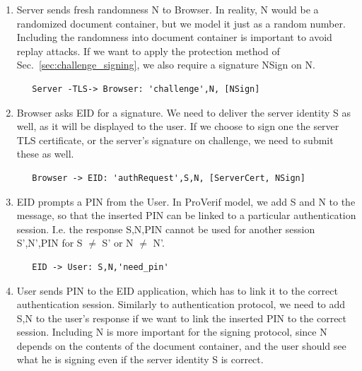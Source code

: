 \begin{enumerate}
\item Server sends fresh randomness N to Browser. In reality, N would be a randomized document container, but we model it just as a random number. Including the randomness into document container is important to avoid replay attacks. If we want to apply the protection method of Sec.~\ref{sec:challenge_signing}, we also require a signature NSign on N.
\begin{verbatim}
   Server -TLS-> Browser: 'challenge',N, [NSign]
\end{verbatim}
\item Browser asks EID for a signature. We need to deliver the server identity S as well, as it will be displayed to the user. If we choose to sign one the server TLS certificate, or the server's signature on challenge, we need to submit these as well.
\begin{verbatim}
   Browser -> EID: 'authRequest',S,N, [ServerCert, NSign]
\end{verbatim}
\item EID prompts a PIN from the User. In ProVerif model, we add S and N to the message, so that the inserted PIN can be linked to a particular authentication session. I.e. the response S,N,PIN cannot be used for another session S',N',PIN for S $\neq$ S' or N $\neq$ N'.
\begin{verbatim}
   EID -> User: S,N,'need_pin'
\end{verbatim}
\item User sends PIN to the EID application, which has to link it to the correct authentication session. Similarly to authentication protocol, we need to add S,N to the user's response if we want to link the inserted PIN to the correct session. Including N is more important for the signing protocol, since N depends on the contents of the document container, and the user should see what he is signing even if the server identity S is correct.
\begin{verbatim}

\end{verbatim}
\end{enumerate}
